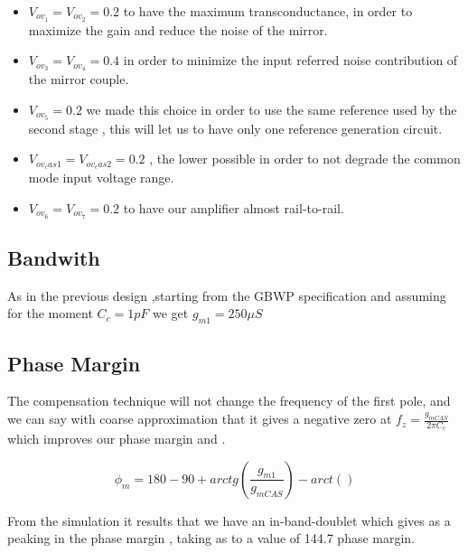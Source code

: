 \begin{itemize}
	\item $V_{ov_1}=V_{ov_2}=0.2$ to have the maximum transconductance, in order to maximize the gain and reduce the noise of the mirror.

	\item $V_{ov_3}=V_{ov_4}=0.4$ in order to minimize the input referred noise contribution of the mirror couple.

	\item $V_{ov_5}=0.2$ we made this choice in order to use the same reference used by the second stage , this will let us to have only one reference generation circuit.

	\item $V_{ov_cas1}=V_{ov_cas2}=0.2$ , the lower possible in order to not degrade the common mode input voltage range.

	\item $V_{ov_6}=V_{ov_7}=0.2$ to have our amplifier almost rail-to-rail.

\end{itemize}

\subsection{Bandwith} %
\label{sub:bandwith}

As in the previous design ,starting from the GBWP specification and assuming for the moment $C_c=1pF$ we get $g_{m1}= 250 \mu S$ 


\subsection{Phase Margin} %
\label{sub:phase_margin}

The compensation technique will not change the frequency of the first pole, and we can say with coarse approximation that it gives a negative zero at $f_z= 	\frac{g_{mCAS}}{2 \pi C_c}$ which improves our phase margin and .

\begin{equation}
	\phi _m= 180 - 90 + arctg(\frac{g_{m1}}{g_{mCAS}}) - arct()
\end{equation}


From the simulation it results that we have an in-band-doublet which gives as a peaking in the phase margin , taking as to a value of 144.7 phase margin.



